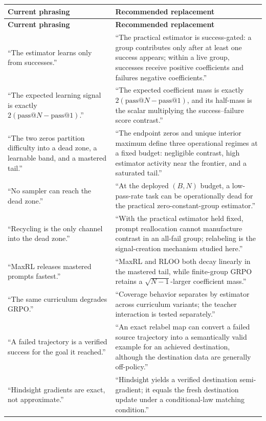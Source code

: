 \documentclass[11pt]{article}
\makeatletter
\newcommand{\PassAt}[1]{\mathrm{pass@}#1}
\theoremstyle{definition}
\theoremstyle{remark}
\makeatother
\begin{document}
\small
\begin{longtable}{p{}p{}}
\toprule
\textbf{Current phrasing} & \textbf{Recommended replacement}\\
\midrule
\endfirsthead
\toprule
\textbf{Current phrasing} & \textbf{Recommended replacement}\\
\midrule
\endhead
``The estimator learns only from successes.'' & ``The practical estimator is success-gated: a group contributes only after at least one success appears; within a live group, successes receive positive coefficients and failures negative coefficients.''\\
\addlinespace
``The expected learning signal is exactly $2(\PassAt{N}-\PassAt{1})$.'' & ``The expected coefficient mass is exactly $2(\PassAt{N}-\PassAt{1})$, and its half-mass is the scalar multiplying the success--failure score contrast.''\\
\addlinespace
``The two zeros partition difficulty into a dead zone, a learnable band, and a mastered tail.'' & ``The endpoint zeros and unique interior maximum define three operational regimes at a fixed budget: negligible contrast, high estimator activity near the frontier, and a saturated tail.''\\
\addlinespace
``No sampler can reach the dead zone.'' & ``At the deployed $(B,N)$ budget, a low-pass-rate task can be operationally dead for the practical zero-constant-group estimator.''\\
\addlinespace
``Recycling is the only channel into the dead zone.'' & ``With the practical estimator held fixed, prompt reallocation cannot manufacture contrast in an all-fail group; relabeling is the signal-creation mechanism studied here.''\\
\addlinespace
``MaxRL releases mastered prompts fastest.'' & ``MaxRL and RLOO both decay linearly in the mastered tail, while finite-group GRPO retains a $\sqrt{N-1}$-larger coefficient mass.''\\
\addlinespace
``The same curriculum degrades GRPO.'' & ``Coverage behavior separates by estimator across curriculum variants; the teacher interaction is tested separately.''\\
\addlinespace
``A failed trajectory is a verified success for the goal it reached.'' & ``An exact relabel map can convert a failed source trajectory into a semantically valid example for an achieved destination, although the destination data are generally off-policy.''\\
\addlinespace
``Hindsight gradients are exact, not approximate.'' & ``Hindsight yields a verified destination semi-gradient; it equals the fresh destination update under a conditional-law matching condition.''\\

\end{longtable}
\end{document}
